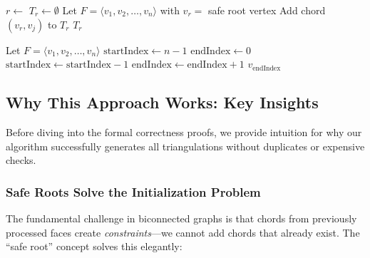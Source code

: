 \documentclass[12pt,a4paper]{article}
\theoremstyle{definition}
\theoremstyle{remark}
\begin{document}
\begin{algorithm}
\caption{Construct Root Triangulation}
\label{alg:safe_root_complete}
\begin{algorithmic}[1]
    \State $r \gets$ 
    \State $T_r \gets \emptyset$
    \State Let $F = \langle v_1, v_2, \ldots, v_n \rangle$ with $v_r = $ safe root vertex
            \State Add chord $(v_r, v_j)$ to $T_r$
        \EndIf
    \EndFor
    \State \Return $T_r$
\EndProcedure

    \State Let $F = \langle v_1, v_2, \ldots, v_n \rangle$
    \State $\text{startIndex} \gets n - 1$
    \State $\text{endIndex} \gets 0$
            \State $\text{startIndex} \gets \text{startIndex} - 1$
        \Else
            \State $\text{endIndex} \gets \text{endIndex} + 1$
        \EndIf
    \EndWhile
    \State \Return $v_{\text{endIndex}}$ 

\EndProcedure
\end{algorithmic}
\end{algorithm}

\subsection{Why This Approach Works: Key Insights}
\label{sec:why_it_works}

Before diving into the formal correctness proofs, we provide intuition for why our algorithm successfully generates all triangulations without duplicates or expensive checks.

\subsubsection{Safe Roots Solve the Initialization Problem}

The fundamental challenge in biconnected graphs is that chords from previously processed faces create \emph{constraints}---we cannot add chords that already exist. The ``safe root'' concept solves this elegantly:
\end{document}
